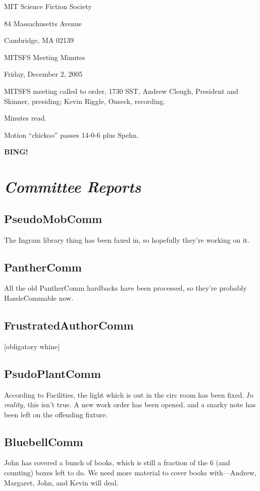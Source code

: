 \documentclass[10pt]{article}
\newcommand{\bing}{{\bf BING!} }
\newcommand{\goto}[1]{\bing \vskip 12pt \section*{{\em{#1}}}}
\newcommand{\ps}{ plus Spehn\xspace}
\begin{document}
\begin{center}

MIT Science Fiction Society

84 Massachusetts Avenue

Cambridge, MA 02139

\vspace{12pt}

MITSFS Meeting Minutes

Friday, December 2, 2005

\end{center}

\vspace{18pt}

\setlength{\parskip}{6pt}

\noindent
MITSFS meeting called to order, 1730 SST, Andrew Clough, President and 
Skinner, presiding; Kevin Riggle,  Onseck, recording.

Minutes read.

Motion ``chickoo'' passes 14-0-6\ps.

\goto{Committee Reports}
\subsection*{PseudoMobComm}
The Ingram library thing has been faxed in, so hopefully they're working on it.

\subsection*{PantherComm}
All the old PantherComm hardbacks have been processed, so they're probably HassleCommable now.

\subsection*{FrustratedAuthorComm}
[obligatory whine]

\subsection*{PsudoPlantComm}
According to Facilities, the light which is out in the circ room has been fixed.  \emph{In reality,}
this isn't true.  A new work order has been opened, and a snarky note has been left on the 
offending fixture.

\subsection*{BluebellComm}
John has covered a bunch of books, which is still a fraction of the 6 (and counting) boxes left to
do.  We need more material to cover books with---Andrew, Margaret, John, and Kevin will deal.
\end{document}

